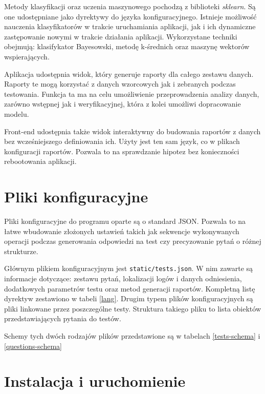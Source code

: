 \documentclass[12pt,a4paper,oneside]{report} %
\begin{document}
Metody klasyfikacji oraz uczenia maszynowego pochodzą z biblioteki \emph{sklearn}. Są one udostępniane jako dyrektywy do języka konfiguracyjnego. Istnieje możliwość nauczenia klasyfikatorów w trakcie uruchamiania aplikacji, jak i ich dynamiczne zastępowanie nowymi w trakcie działania aplikacji. Wykorzystane techniki obejmują: klasifykator Bayesowski, metodę k-średnich oraz maszynę wektorów wspierających.\par

Aplikacja udostępnia widok, który generuje raporty dla całego zestawu danych. Raporty te mogą korzystać z danych wzorcowych jak i zebranych podczas testowania. Funkcja ta ma na celu umożliwienie przeprowadzenia analizy danych, zarówno wstępnej jak i weryfikacyjnej, która z kolei umożliwi dopracowanie modelu.\par

Front-end udostępnia także widok interaktywny do budowania raportów z danych bez wcześniejszego definiowania ich. Użyty jest ten sam język, co w plikach konfiguracji raportów. Pozwala to na sprawdzanie hipotez bez konieczności rebootowania aplikacji.\par

\section{Pliki konfiguracyjne}

Pliki konfiguracyjne do programu oparte są o standard JSON. Pozwala to na łatwe wbudowanie złożonych ustawień takich jak sekwencje wykonywanych operacji podczas generowania odpowiedzi na test czy precyzowanie pytań o różnej strukturze.\par

Głównym plikiem konfiguracyjnym jest \texttt{static/tests.json}. W nim zawarte są informacje dotyczące: zestawu pytań, lokalizacji logów i danych odniesienia, dodatkowych parametrów testu oraz metod generacji raportów. Kompletną listę dyrektyw zestawiono w tabeli \ref{lang}. Drugim typem plików konfiguracyjnych są pliki linkowane przez poszczególne testy. Struktura takiego pliku to lista obiektów przedstawiających pytania do testów.\par

Schemy tych dwóch rodzajów plików przedstawione są w tabelach \ref{tests-schema} i \ref{questions-schema}

\section{Instalacja i uruchomienie}
\end{document}
